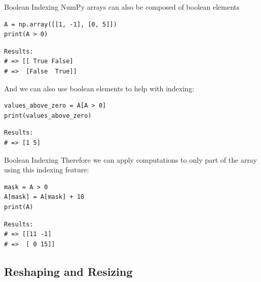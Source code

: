 \documentclass[10pt]{beamer}
\begin{document}
\begin{frame}[label={sec:orgdf02ac8},fragile]{Boolean Indexing}
 NumPy arrays can also be composed of boolean elements

\begin{verbatim}
A = np.array([[1, -1], [0, 5]])
print(A > 0)
\end{verbatim}

\begin{verbatim}
Results: 
# => [[ True False]
# =>  [False  True]]
\end{verbatim}


And we can also use boolean elements to help with indexing:

\begin{verbatim}
values_above_zero = A[A > 0]
print(values_above_zero)
\end{verbatim}

\begin{verbatim}
Results: 
# => [1 5]
\end{verbatim}
\end{frame}

\begin{frame}[label={sec:org324c02a},fragile]{Boolean Indexing}
 Therefore we can apply computations to only part of the array using this indexing
feature:

\begin{verbatim}
mask = A > 0
A[mask] = A[mask] + 10
print(A)
\end{verbatim}

\begin{verbatim}
Results: 
# => [[11 -1]
# =>  [ 0 15]]
\end{verbatim}
\end{frame}

\subsection{Reshaping and Resizing}
\label{sec:org5a5de95}
\end{document}
